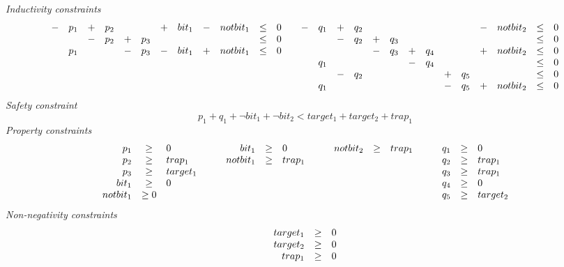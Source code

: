 \noindent \emph{Inductivity constraints}
$$
\begin{array}[t]{clclclclclcl}
    -  & p_1 &  +  & p_2 &     &     &  +  & bit_1 &  -  & notbit_1 &  \le  & 0 \\
       &     &  -  & p_2 &  +  & p_3 &     &       &     &          &  \le  & 0 \\
       & p_1 &     &     &  -  & p_3 &  -  & bit_1 &  +  & notbit_1 &  \le  & 0
\end{array}\quad
\begin{array}[t]{clclclclclclclclclcl}
    -  & q_1 &  +  & q_2 &     &     &     &     &     &     &  -  & notbit_2 &  \le  & 0  \\
       &     &  -  & q_2 &  +  & q_3 &     &     &     &     &     &          &  \le  & 0  \\
       &     &     &     &  -  & q_3 &  +  & q_4 &     &     &  +  & notbit_2 &  \le  & 0  \\
       & q_1 &     &     &     &     &  -  & q_4 &     &     &     &          &  \le  & 0  \\
       &     &  -  & q_2 &     &     &     &     &  +  & q_5 &     &          &  \le  & 0  \\
       & q_1 &     &     &     &     &     &     &  -  & q_5 &  +  & notbit_2 &  \le  & 0 
\end{array}
$$
\emph{Safety constraint}
$$    
p_1 + q_1 + \neg bit_1 + \neg bit_2 < target_1 + target_2 + trap_1
$$
\emph{Property constraints}
$$
\begin{array}[t]{rcl}
  p_1   & \ge & 0 \\
  p_2   & \ge & trap_1 \\
  p_3   & \ge & target_1 \\
  bit_1 & \ge & 0 \\
  notbit_1 & \ge 0
\end{array}
\qquad
\begin{array}[t]{rcl}
  bit_1 & \ge & 0 \\
  notbit_1 & \ge & trap_1
\end{array}
\qquad
\begin{array}[t]{rcl}
  notbit_2 & \ge & trap_1
\end{array}
\qquad
\begin{array}[t]{rcl}
  q_1   & \ge & 0 \\
  q_2   & \ge & trap_1 \\
  q_3   & \ge & trap_1 \\
  q_4   & \ge & 0 \\
  q_5   & \ge & target_2 \\
\end{array}
$$
\emph{Non-negativity constraints}
$$
\begin{array}[t]{rcl}
  target_1 & \ge & 0 \\
  target_2 & \ge & 0 \\
  trap_1   & \ge & 0
\end{array}
$$

